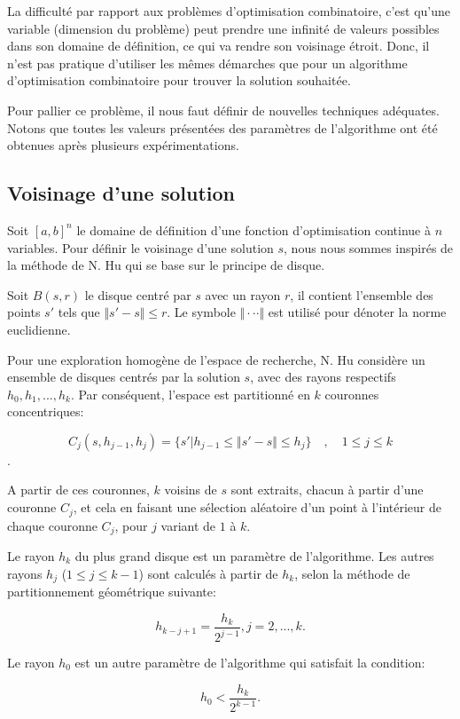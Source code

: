 La difficulté par rapport aux problèmes d'optimisation combinatoire,
c'est qu'une variable (dimension du problème) peut prendre une
infinité de valeurs possibles dans son domaine de définition, ce qui va
rendre son voisinage étroit. Donc, il n'est pas pratique d'utiliser les
mêmes démarches que pour un algorithme d'optimisation combinatoire pour
trouver la solution souhaitée.

Pour pallier ce problème, il nous faut définir de nouvelles techniques adéquates. Notons que toutes les valeurs présentées des paramètres de l'algorithme ont été obtenues après plusieurs expérimentations.

\subsection{Voisinage d'une solution}
Soit $[a,b]^n$ le domaine de définition d'une fonction d'optimisation continue à $n$ variables. Pour définir le voisinage d'une solution $s$, nous nous sommes inspirés de la méthode de N. Hu \cite{Hu_1992} qui se base sur le principe de disque.

Soit $B(s,r)$ le disque centré par $s$ avec un rayon $r$, il contient l'ensemble des points $s'$ tels que $\Vert s'- s\Vert \leq r$. Le symbole $\Vert \cdot\cdot\cdot \Vert$ est utilisé pour dénoter la norme euclidienne.

Pour une exploration homogène de l'espace de recherche, N. Hu considère un ensemble de disques centrés par la solution $s$, avec des rayons respectifs $h_0,h_1,...,h_k$. Par conséquent, l'espace est partitionné en $k$ couronnes concentriques:

$$C_j(s,h_{j-1},h_j)=\{s'\vert h_{j-1}\leq \Vert s'-s\Vert \leq h_j\}\quad , \quad 1 \leq j \leq k $$.

A partir de ces couronnes, $k$ voisins de $s$ sont extraits, chacun à partir d'une couronne $C_j$, et cela en faisant une sélection aléatoire d'un point à l'intérieur de chaque couronne $C_j$, pour $j$ variant de $1$ à $k$.

Le rayon $h_k$ du plus grand disque est un paramètre de l'algorithme. Les autres rayons $h_j$ ($1\leq j\leq k-1$) sont calculés à partir de $h_k$,  selon la méthode de partitionnement géométrique suivante:

$$
h_{k-j+1}=\frac{h_k}{2^{j-1}}, j=2,...,k.
$$

Le rayon $h_0$ est un autre paramètre de l'algorithme qui satisfait la condition:

$$
h_0<\frac{h_k}{2^{k-1}}.
$$

